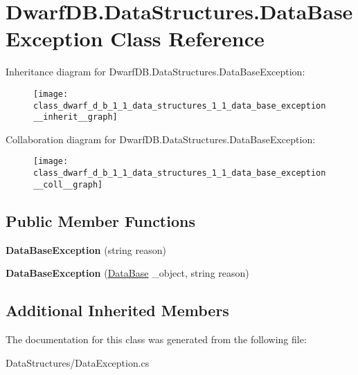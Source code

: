 \hypertarget{class_dwarf_d_b_1_1_data_structures_1_1_data_base_exception}{\section{Dwarf\+D\+B.\+Data\+Structures.\+Data\+Base\+Exception Class Reference}
\label{class_dwarf_d_b_1_1_data_structures_1_1_data_base_exception}
}


Inheritance diagram for Dwarf\+D\+B.\+Data\+Structures.\+Data\+Base\+Exception\+:
\nopagebreak
\begin{figure}[H]
\begin{center}
\leavevmode
\texttt{[image: class\_dwarf\_d\_b\_1\_1\_data\_structures\_1\_1\_data\_base\_exception\_\_inherit\_\_graph]}
\end{center}
\end{figure}


Collaboration diagram for Dwarf\+D\+B.\+Data\+Structures.\+Data\+Base\+Exception\+:
\nopagebreak
\begin{figure}[H]
\begin{center}
\leavevmode
\texttt{[image: class\_dwarf\_d\_b\_1\_1\_data\_structures\_1\_1\_data\_base\_exception\_\_coll\_\_graph]}
\end{center}
\end{figure}
\subsection*{Public Member Functions}
\begin{DoxyCompactItemize}
\item 
\hypertarget{class_dwarf_d_b_1_1_data_structures_1_1_data_base_exception_ac31189f613083b06927c5b7b62a5415a}{{\bfseries Data\+Base\+Exception} (string reason)}\label{class_dwarf_d_b_1_1_data_structures_1_1_data_base_exception_ac31189f613083b06927c5b7b62a5415a}

\item 
\hypertarget{class_dwarf_d_b_1_1_data_structures_1_1_data_base_exception_a92e1a400cd2702fd38385c374478981e}{{\bfseries Data\+Base\+Exception} (\hyperlink{class_dwarf_d_b_1_1_data_structures_1_1_data_base}{Data\+Base} \+\_\+object, string reason)}\label{class_dwarf_d_b_1_1_data_structures_1_1_data_base_exception_a92e1a400cd2702fd38385c374478981e}

\end{DoxyCompactItemize}
\subsection*{Additional Inherited Members}


The documentation for this class was generated from the following file\+:\begin{DoxyCompactItemize}
\item 
Data\+Structures/Data\+Exception.\+cs\end{DoxyCompactItemize}
